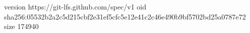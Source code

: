 version https://git-lfs.github.com/spec/v1
oid sha256:05532b2a2c5d215cbf2e31ef5cfc5e12e41c2c46e490b9bf5702bd25a0787e72
size 174940

